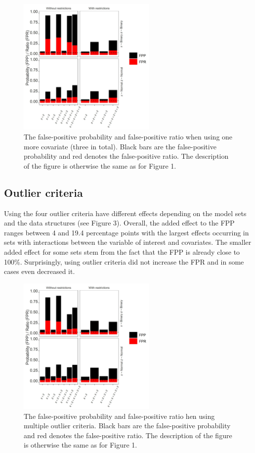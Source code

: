 \begin{figure}[hbt!]
\includegraphics[width=0.6\textwidth]{R/Analysis/Result/Figures/Figure1C.jpeg}
\centering
\caption{The false-positive probability and false-positive ratio when using one more covariate (three in total). Black bars are the false-positive probability and red denotes the false-positive ratio. The description of the figure is otherwise the same as for Figure 1.}
\label{fig:mainfigure}
\end{figure}

\subsection{Outlier criteria}
Using the four outlier criteria have different effects depending on the model sets and the data structures (see Figure 3). Overall, the added effect to the FPP ranges between 4 and 19.4 percentage points with the largest effects occurring in sets with interactions between the variable of interest and covariates. The smaller added effect for some sets stem from the fact that the FPP is already close to 100\%. Surprisingly, using outlier criteria did not increase the FPR and in some cases even decreased it. 

\begin{figure}[hbt!]
\includegraphics[width=0.6\textwidth]{R/Analysis/Result/Figures/Figure1B.jpeg}
\centering
\caption{The false-positive probability and false-positive ratio hen using multiple outlier criteria. Black bars are the false-positive probability and red denotes the false-positive ratio. The description of the figure is otherwise the same as for Figure 1.}
\label{fig:mainfigure}
\end{figure}

